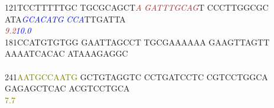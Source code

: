 \documentclass[11pt,twoside,reqno,a4paper]{article}
\begin{document}
{121\hspace*{1\charwidth}TCCTTTTTGC	TGCGCAGCT\textit{\textcolor{brown}{A}}	\textit{\textcolor{brown}{G}}\textit{\textcolor{brown}{A}}\textit{\textcolor{brown}{T}}\textit{\textcolor{brown}{T}}\textit{\textcolor{brown}{T}}\textit{\textcolor{brown}{G}}\textit{\textcolor{brown}{C}}\textit{\textcolor{brown}{A}}\textit{\textcolor{brown}{G}}T	CCCTTGGCGC	ATA\textit{\textcolor{blue}{G}}\textit{\textcolor{blue}{C}}\textit{\textcolor{blue}{A}}\textit{\textcolor{blue}{C}}\textit{\textcolor{blue}{A}}\textit{\textcolor{blue}{T}}\textit{\textcolor{blue}{G}}	\textit{\textcolor{blue}{C}}\textit{\textcolor{blue}{C}}\textit{\textcolor{blue}{A}}TTGATTA	\\
\hspace*{4\charwidth}\hspace*{1\charwidth}\hspace*{19\charwidth}\textit{\textcolor{brown}{9.2}}\hspace*{1\charwidth}\hspace*{1\charwidth}\hspace*{1\charwidth}\hspace*{21\charwidth}\textit{\textcolor{blue}{10.0}}\hspace*{1\charwidth}\hspace*{1\charwidth}\\
181\hspace*{1\charwidth}CCATGTGTGG	GAATTAGCCT	TGCGAAAAAA	GAAGTTAGTT	AAAATCACAC	ATAAAGAGGC	\\
\hspace*{4\charwidth}\hspace*{1\charwidth}\hspace*{1\charwidth}\hspace*{1\charwidth}\hspace*{1\charwidth}\hspace*{1\charwidth}\hspace*{1\charwidth}\\
241\hspace*{1\charwidth}\textcolor{olive}{A}\textcolor{olive}{A}\textcolor{olive}{T}\textcolor{olive}{G}\textcolor{olive}{C}\textcolor{olive}{C}\textcolor{olive}{A}\textcolor{olive}{A}\textcolor{olive}{T}\textcolor{olive}{G}	GCTGTAGGTC	CCTGATCCTC	CGTCCTGGCA	GAGAGCTCAC	ACGTCCTGCA	\\
\hspace*{4\charwidth}\hspace*{0\charwidth}\textcolor{olive}{7.7}\hspace*{1\charwidth}\hspace*{1\charwidth}\hspace*{1\charwidth}\hspace*{1\charwidth}\hspace*{1\charwidth}\hspace*{1\charwidth}\\
}
\end{document}

